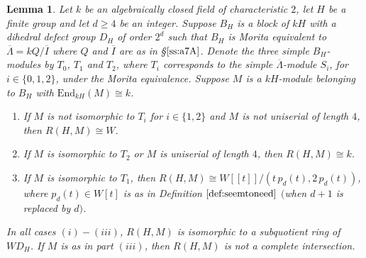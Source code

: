 \documentclass{amsart}
\theoremstyle{plain}
\newtheorem{lemma}[thm]{Lemma}
\theoremstyle{definition}
\theoremstyle{remark}
\begin{document}
\begin{lemma}
\label{lem:moreIII}
Let $k$ be an algebraically closed field of characteristic $2$, let $H$ be a finite group and let $d\ge 4$
be an integer. Suppose $B_H$ is a block of $kH$ with a dihedral defect group $D_H$ of order $2^d$ 
such that $B_H$ is Morita equivalent to $\overline{\Lambda}=kQ/\overline{I}$ where $Q$ and 
$\overline{I}$ are as in \S$\ref{ss:a7A}$.
Denote the three simple $B_H$-modules by $T_0$, $T_1$ and $T_2$, where 
$T_i$ corresponds to the simple $\overline{\Lambda}$-module $S_i$, for $i\in\{0,1,2\}$,
under the Morita equivalence. 
Suppose $M$ is a $kH$-module belonging to $B_H$ with $\mathrm{End}_{kH}(M)\cong k$.
\begin{enumerate}
\item[(i)] If $M$ is not isomorphic to $T_i$ for $i\in\{1,2\}$ and $M$ is not uniserial of length $4$, 
then $R(H,M)\cong W$.
\item[(ii)] If $M$ is isomorphic to $T_2$ or $M$ is uniserial of length $4$, then $R(H,M)\cong k$.
\item[(iii)] If $M$ is isomorphic to $T_1$, then $R(H,M)\cong W[[t]]/(t\,p_d(t),2\,p_d(t))$, where
$p_d(t)\in W[t]$ is as in Definition $\ref{def:seemtoneed}$ $($when $d+1$ is replaced by $d$$)$.
\end{enumerate}
In all cases $(i)-(iii)$, $R(H,M)$ is isomorphic to a subquotient ring of $WD_H$. If $M$ is as in part $(iii)$,
then $R(H,M)$ is not a complete intersection.
\end{lemma}
\end{document}
